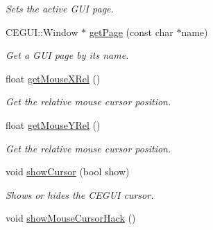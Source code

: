 \begin{DoxyCompactItemize}
\begin{DoxyCompactList}\small\item\em \-Sets the active \-G\-U\-I page. \end{DoxyCompactList}\item 
\hypertarget{classWindowManager_aed8e23d9a6814c065a47113372b6a850}{
\-C\-E\-G\-U\-I\-::\-Window $\ast$ \hyperlink{classWindowManager_aed8e23d9a6814c065a47113372b6a850}{get\-Page} (const char $\ast$name)}
\label{d9/d6e/classWindowManager_aed8e23d9a6814c065a47113372b6a850}

\begin{DoxyCompactList}\small\item\em \-Get a \-G\-U\-I page by its name. \end{DoxyCompactList}\item 
\hypertarget{classWindowManager_aa7039cfa23319cf5fee4765822a56d00}{
float \hyperlink{classWindowManager_aa7039cfa23319cf5fee4765822a56d00}{get\-Mouse\-X\-Rel} ()}
\label{d9/d6e/classWindowManager_aa7039cfa23319cf5fee4765822a56d00}

\begin{DoxyCompactList}\small\item\em \-Get the relative mouse cursor position. \end{DoxyCompactList}\item 
\hypertarget{classWindowManager_a731292eeff712cf32fc0eb431a33b6df}{
float \hyperlink{classWindowManager_a731292eeff712cf32fc0eb431a33b6df}{get\-Mouse\-Y\-Rel} ()}
\label{d9/d6e/classWindowManager_a731292eeff712cf32fc0eb431a33b6df}

\begin{DoxyCompactList}\small\item\em \-Get the relative mouse cursor position. \end{DoxyCompactList}\item 
\hypertarget{classWindowManager_aed7762396f247aaba3103d169cadf4d7}{
void \hyperlink{classWindowManager_aed7762396f247aaba3103d169cadf4d7}{show\-Cursor} (bool show)}
\label{d9/d6e/classWindowManager_aed7762396f247aaba3103d169cadf4d7}

\begin{DoxyCompactList}\small\item\em \-Shows or hides the \-C\-E\-G\-U\-I cursor. \end{DoxyCompactList}\item 
\hypertarget{classWindowManager_a86975bdd7b26e2fab18c8ef0b3715e7e}{
void \hyperlink{classWindowManager_a86975bdd7b26e2fab18c8ef0b3715e7e}{show\-Mouse\-Cursor\-Hack} ()}
\label{d9/d6e/classWindowManager_a86975bdd7b26e2fab18c8ef0b3715e7e}


\end{DoxyCompactItemize}
